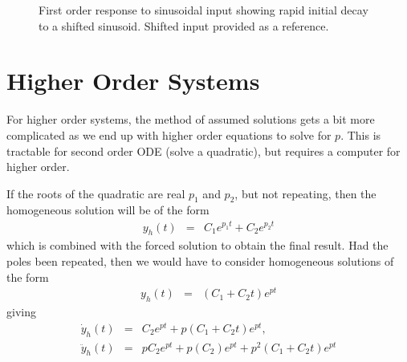 \documentclass[12pt]{article}
\begin{document}
\begin{figure}[h]
\def\tm{6}
{\centering 
{}   }
\caption{First order response to sinusoidal input showing rapid initial decay to a shifted sinusoid. Shifted input provided as a reference.}
\end{figure}

\section{Higher Order Systems}
For higher order systems, the method of assumed solutions gets a bit more complicated as we end up with higher order equations to solve for $p$. This is tractable for second order ODE (solve a quadratic), but requires a computer for higher order. 

If the roots of the quadratic are real $p_1$ and $p_2$, but not repeating, then the homogeneous solution will be of the form
\begin{eqnarray}
y_h(t) &=& C_1 e^{p_1t} + C_2 e^{p_2t} 
\end{eqnarray}
which is combined with the forced solution to obtain the final result. Had the poles been repeated, then we would have to consider homogeneous solutions of the form 
\begin{eqnarray}
y_h(t) &=& (C_1 + C_2t) e^{pt} 
\end{eqnarray}
giving
\begin{eqnarray}
\dot y_h(t) &=& C_2 e^{pt} + p(C_1 + C_2t) e^{pt},\\ \ddot y_h(t) &=& pC_2 e^{pt} + p(C_2) e^{pt} + p^2(C_1 + C_2t) e^{pt}
\end{eqnarray}
\end{document}
